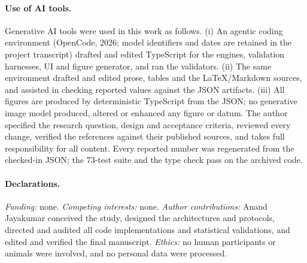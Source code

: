 \documentclass{article}
\begin{document}
\paragraph{Use of AI tools.}
Generative AI tools were used in this work as follows. (i) An agentic coding environment (OpenCode, 2026; model identifiers and dates are retained in the project transcript) drafted and edited TypeScript for the engines, validation harnesses, UI and figure generator, and ran the validators. (ii) The same environment drafted and edited prose, tables and the \LaTeX/Markdown sources, and assisted in checking reported values against the JSON artifacts. (iii) All figures are produced by deterministic TypeScript from the JSON; no generative image model produced, altered or enhanced any figure or datum. The author specified the research question, design and acceptance criteria, reviewed every change, verified the references against their published sources, and takes full responsibility for all content. Every reported number was regenerated from the checked-in JSON; the 73-test suite and the type check pass on the archived code.

\paragraph{Declarations.}
\textit{Funding:} none. \textit{Competing interests:} none. \textit{Author contributions:} Anand Jayakumar conceived the study, designed the architectures and protocols, directed and audited all code implementations and statistical validations, and edited and verified the final manuscript. \textit{Ethics:} no human participants or animals were involved, and no personal data were processed.


\end{document}
